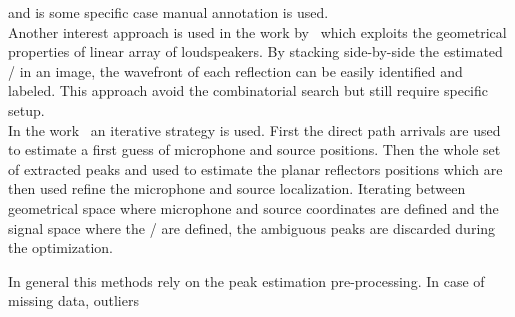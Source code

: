 and is some specific case manual annotation is used.
\\Another interest approach is used in the work by~ which exploits the geometrical properties of linear array of loudspeakers.
By stacking side-by-side the estimated \RIRs/ in an image, the wavefront of each reflection can be easily identified and labeled.
This approach avoid the combinatorial search but still require specific setup.
\\In the work~ an iterative strategy is used. First the direct path arrivals are used to estimate a first guess of microphone and source positions.
Then the whole set of extracted peaks and used to estimate the planar reflectors positions which are then used refine the microphone and source localization.
Iterating between geometrical space where microphone and source coordinates are defined and the signal space where the \TOAs/ are defined, the ambiguous peaks are discarded during the optimization.

\mynewline
In general this methods rely on the peak estimation pre-processing. In case of missing data, outliers


